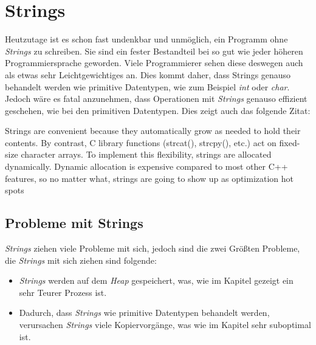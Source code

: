 \section{Strings}\label{sec:strings}
Heutzutage ist es schon fast undenkbar und unmöglich, ein Programm ohne \emph{Strings} zu
schreiben. Sie sind ein fester Bestandteil bei so gut wie jeder höheren Programmiersprache
geworden. Viele Programmierer sehen diese deswegen auch als etwas sehr Leichtgewichtiges an. Dies
kommt
daher, dass Strings genauso behandelt werden wie primitive Datentypen, wie zum Beispiel \emph{int}
oder \emph{char}. Jedoch wäre es fatal anzunehmen, dass Operationen mit \emph{Strings} genauso
effizient geschehen, wie bei den primitiven Datentypen. Dies zeigt auch das folgende Zitat:

\begin{zitat}
    Strings are convenient because they automatically grow as needed to hold their contents. By
    contrast, C library functions (strcat(), strcpy(), etc.) act on fixed-size character arrays.
    To implement this flexibility, strings are allocated dynamically. Dynamic allocation is
    expensive compared to most other C++ features, so no matter what, strings are going to show
    up as optimization hot spots \cite{OptimizedC++}
\end{zitat}

\subsection{Probleme mit Strings}\label{subsec:stringprobleme}
\emph{Strings} ziehen viele Probleme mit sich, jedoch sind die zwei Größten Probleme, die
\emph{Strings} mit sich ziehen sind folgende:

\begin{itemize}
    \item \emph{Strings} werden auf dem \emph{Heap} gespeichert, was, wie im Kapitel
    \emph{} gezeigt ein sehr Teurer Prozess ist.
    \item Dadurch, dass \emph{Strings} wie primitive Datentypen behandelt werden, verursachen
    \emph{Strings} viele Kopiervorgänge, was wie im Kapitel \emph{} sehr
    suboptimal ist.
\end{itemize}

